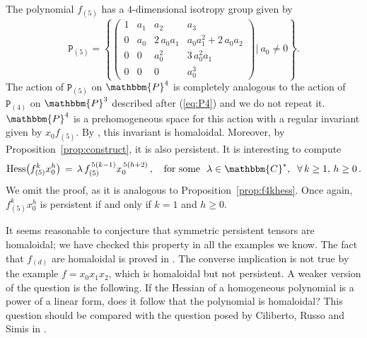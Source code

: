 \documentclass[aps,floatfix,groupedaddress,superscriptaddress,longbibliography,footinbib,notitlepage,showpacs]{revtex4-1}
\def\Hess{{\rm Hess}}
\newtheorem{remark}[theorem]{Remark}
\begin{document}
The polynomial $f_{(5)}$ has a $4$-dimensional isotropy group given by
\begin{equation}
\mathtt{P}_{(5)}=\left\{
\begin{pmatrix}
1&a_{1}&a_{2}&a_{3}\\
0&a_{0}&2\,a_{0}a_{1}&a_{0}a_{1}^{2}+2\,a_{0}a_{2}\\
0&0&a_{0}^{2}&3\,a_{0}^{2}a_{1}\\
0&0&0&a_{0}^{3}
\end{pmatrix} \Big|~a_0\neq 0\right\}.
\end{equation}
The action of $\mathtt{P}_{(5)}$ on $\mathbbm{P}^4$ is completely analogous to the action of $\mathtt{P}_{(4)}$ on $\mathbbm{P}^3$ described after (\ref{eq:P4}) and we do not repeat it. $\mathbbm{P}^4$ is a prehomogeneous space for this action with a regular invariant given by $x_0f_{(5)}$. By \cite[Lemma~1]{Dol}, this invariant is homaloidal. Moreover, by Proposition~\ref{prop:construct}, it is also persistent.  
It is interesting to compute
\begin{equation}
\Hess\big(f_{(5)}^k x_0^h\big)\,=\,\lambda\, f_{(5)}^{\,5(k-1)} x_0^{\,5(h+2)}\,, \quad \text{for some}~~\lambda\in\mathbbm{C}^*, \;\; \forall\, k \geq 1, \, h \geq 0\,.
\end{equation}
We omit the proof, as it is analogous to Proposition~\ref{prop:f4khess}.  
Once again, $f_{(5)}^k x_0^h$ is persistent if and only if $k=1$ and $h \geq 0$.


It seems reasonable to conjecture that symmetric persistent tensors are homaloidal; we have checked this property in all the examples we know. The fact that $f_{(d)}$ are homaloidal is proved in \cite[Theorem 4.4]{CRS}. The converse implication is not true by the example $f=x_0x_1x_2$, which is homaloidal but not persistent.
A weaker version of the question is the following. If the Hessian of a homogeneous polynomial is a power of a linear form, does it follow that the polynomial is homaloidal?  This question should be compared with the question posed by Ciliberto, Russo and Simis in \cite[Remark 3.5]{CRS}.

\end{document}
